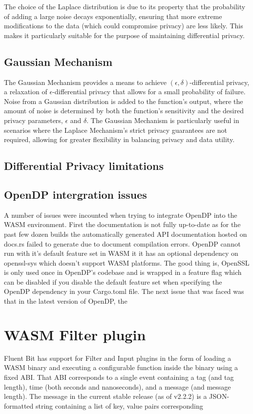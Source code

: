 The choice of the Laplace distribution is due to its property that the probability of adding a large noise decays exponentially, ensuring that more extreme modifications to the data (which could compromise privacy) are less likely. This makes it particularly suitable for the purpose of maintaining differential privacy.

\subsection{Gaussian Mechanism}
The Gaussian Mechanism provides a means to achieve $(\epsilon, \delta)$-differential privacy, a relaxation of $\epsilon$-differential privacy that allows for a small probability of failure. Noise from a Gaussian distribution is added to the function's output, where the amount of noise is determined by both the function's sensitivity and the desired privacy parameters, $\epsilon$ and $\delta$. The Gaussian Mechanism is particularly useful in scenarios where the Laplace Mechanism's strict privacy guarantees are not required, allowing for greater flexibility in balancing privacy and data utility.

\subsection{Differential Privacy limitations}

\subsection{OpenDP intergration issues}
A number of issues were incounted when trying to integrate OpenDP into the WASM environment. First the documentation is not fully up-to-date as for the past few dozen builds the automatically generated API documentation hosted on docs.rs failed to generate due to document compilation errors. OpenDP cannot run with it's default feature set in WASM it it has an optional dependency on openssl-sys which doesn't support WASM platforms. The good thing is, OpenSSL is only used once in OpenDP's codebase and is wrapped in a feature flag which can be disabled if you disable the default feature set when specifying the OpenDP dependency in your Cargo.toml file. The next issue that was faced was that in the latest version of OpenDP, the 
\section{WASM Filter plugin}
Fluent Bit has support for Filter and Input plugins in the form of loading a WASM binary and executing a configurable function inside the binary using a fixed ABI. That ABI corresponds to a single event containing a tag (and tag length), time (both seconds and nanoseconds), and a message (and message length). The message in the current stable release (as of v2.2.2) is a JSON-formatted string containing a list of key, value pairs corresponding 


